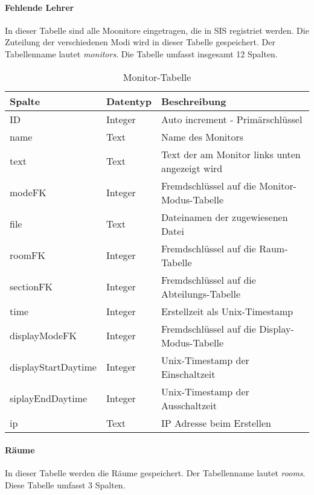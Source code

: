 \paragraph{Fehlende Lehrer\\}
In dieser Tabelle sind alle Moonitore eingetragen, die in SIS registriet werden. Die Zuteilung der verschiedenen Modi wird in dieser Tabelle gespeichert. Der Tabellenname lautet \textit{monitors}. Die Tabelle umfasst insgesamt 12 Spalten.

\begin{table}[H]
\centering
\begin{tabular}{p{2.5 cm}p{2.5 cm}p{10 cm}}
   \toprule
   \textbf{Spalte} & \textbf{Datentyp} & \textbf{Beschreibung} \\
   \midrule
          ID & Integer & Auto increment - Primärschlüssel  \\
          \hline
          name & Text & Name des Monitors   \\
          \hline
	      text & Text & Text der am Monitor links unten angezeigt wird  \\
	      \hline
          modeFK & Integer & Fremdschlüssel auf die Monitor-Modus-Tabelle   \\
          \hline
          file & Text & Dateinamen der zugewiesenen Datei    \\
          \hline
          roomFK & Integer & Fremdschlüssel auf die Raum-Tabelle   \\
          \hline
          sectionFK & Integer & Fremdschlüssel auf die Abteilungs-Tabelle   \\
          \hline
	      time & Integer & Erstellzeit als Unix-Timestamp   \\
	      \hline
          displayModeFK & Integer & Fremdschlüssel auf die Display-Modus-Tabelle   \\
          \hline
          displayStartDaytime & Integer & Unix-Timestamp der Einschaltzeit   \\
          \hline
          siplayEndDaytime & Integer & Unix-Timestamp der Ausschaltzeit   \\
          \hline                    	      
          ip & Text & IP Adresse beim Erstellen  \\
   \bottomrule
\end{tabular}
\caption{Monitor-Tabelle}
\end{table}

\paragraph{Räume\\}
In dieser Tabelle werden die Räume gespeichert. Der Tabellenname lautet \textit{rooms}. Diese Tabelle umfasst 3 Spalten.

